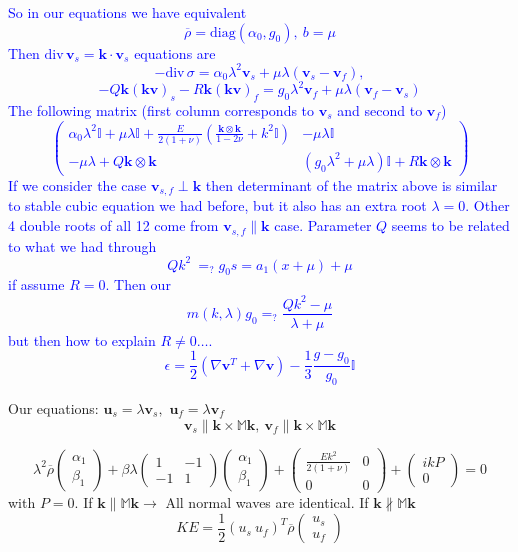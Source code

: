 \documentclass[12pt]{article}
\numberwithin{theorem}{section}
\def\div{\mbox{div}\,}
\begin{document}
\textcolor{blue}{
So in our equations we have equivalent 
\[\overline\rho = \mathrm{diag}(\alpha_0, g_0),\ b = \mu\]
Then $\div \mathbf{v}_s = \mathbf{k\cdot v}_s$
equations are
\[-\div \sigma = \alpha_0 \lambda^2 \mathbf{v}_s + \mu\lambda(\mathbf{v}_s-\mathbf{v}_f),\]
\[-Q \mathbf{k(kv)}_s - R\mathbf{k(kv)}_f = g_0 \lambda^2 \mathbf{v}_f + \mu\lambda(\mathbf{v}_f-\mathbf{v}_s)\]
The following matrix (first column corresponds to $\mathbf{v}_s$ and second to $\mathbf{v}_f$)
\[
\left( 
\begin{array}{cc}
\alpha_0\lambda^2 \mathbb{I} + \mu\lambda\mathbb{I}+\frac{E}{2(1+\nu)}(\frac{\mathbf{k\otimes k}}{1-2\nu}+k^2\mathbb{I}) & -\mu\lambda \mathbb{I} \\
-\mu\lambda + Q \mathbf{k\otimes k} & (g_0\lambda^2 + \mu \lambda)\mathbb{I} + R \mathbf{k\otimes k}
\end{array}
\right) \]
If we consider the case $\mathbf{v}_{s,f} \perp \mathbf{k}$ then determinant of the matrix above is similar to stable cubic equation we had before, but it also has an extra root $\lambda = 0.$ Other 4 double roots of all 12 come from $\mathbf{v}_{s,f} \parallel \mathbf{k}$ case. Parameter $Q$ seems to be related to what we had through \[Qk^2\ =_? g_0 s = a_1(x+\mu)+\mu\] if assume $R = 0.$ Then our 
\[m(k, \lambda)g_0 =_? \frac{Qk^2 - \mu}{\lambda + \mu}\]
but then how to explain $R \ne 0\ldots.$
\[\epsilon = \frac12\left(\nabla \mathbf{v}^T+\nabla \mathbf{v}\right) - \frac13\frac{g - g_0}{g_0}\mathbb{I}\]
}

Our equations: $\mathbf{u}_s = \lambda \mathbf{v}_s,$ $\mathbf{u}_f = \lambda \mathbf{v}_f$
\[\mathbf{v}_s \parallel \mathbf{k}\times \mathbb{M}\mathbf{k},\ \mathbf{v}_f \parallel \mathbf{k}\times \mathbb{M}\mathbf{k}\]

\[\lambda^2 \overline{\rho} \left(\begin{array}{c}\alpha_1\\ \beta_1\end{array}\right)+
\beta\lambda
\left(\begin{array}{cc}1 & -1\\ -1 & 1\end{array}\right)
\left(\begin{array}{c}\alpha_1\\ \beta_1\end{array}\right)+
\left(\begin{array}{cc}\frac{Ek^2}{2(1+\nu)} & 0\\ 0 & 0\end{array}\right)+\left(\begin{array}{c}ikP\\ 0\end{array}\right)=0\]
with $P = 0.$
If $\mathbf{k} \parallel \mathbb{M}\mathbf{k} \rightarrow$ All normal waves are identical.
If $\mathbf{k} \not\parallel \mathbb{M}\mathbf{k}$
\[KE = \frac12(u_s\ u_f)^T\overline{\rho}\left(\begin{array}{c}u_s\\ u_f\end{array}\right)\]
\end{document}
